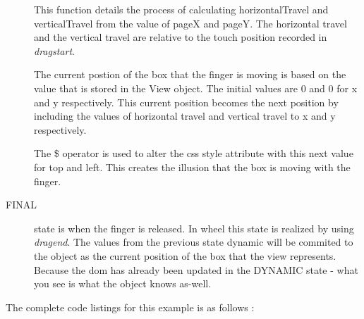 \begin{description}
     This function details the process of calculating horizontalTravel and verticalTravel from the value of pageX
     and pageY. The horizontal travel and the vertical travel are relative to the touch position recorded in \emph{dragstart}.
   
     The current postion of the box that the finger is moving is based on the value that is stored in the View object.
     The initial values are 0 and 0 for x and y respectively. This current position becomes the next position by including
     the values of horizontal travel and vertical travel to x and y respectively.
   
     The \$ operator is used to alter the css style attribute with this next value for top and left. This creates the
     illusion that the box is moving with the finger.
   
   \item[FINAL] state is when the finger is released. In wheel this state is realized by using \emph{dragend}.
     The values from the previous state dynamic will be commited to the object as the current position of the box that
     the view represents. Because the dom has already been updated in the DYNAMIC state - what you see is what the
     object knows as-well.
    

 \end{description}

 \newpage
 The complete code listings for this example is as follows :
 

